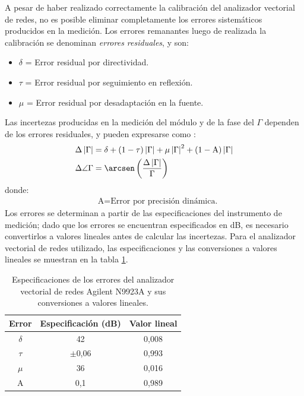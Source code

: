 A pesar de haber realizado correctamente la calibración del analizador vectorial de redes, no es posible eliminar completamente los errores sistemáticos producidos en la medición. Los errores remanantes luego de realizada la calibración se denominan \emph{errores residuales}, y son:
\begin{itemize}
\item $\delta$ = Error residual por directividad.
\item $\tau$ = Error residual por seguimiento en reflexión.
\item $\mu$ = Error residual por desadaptación en la fuente.
\end{itemize}
Las incertezas producidas en la medición del módulo y de la fase del $\Gamma$ dependen de los errores residuales, y pueden expresarse como \cite{Agilent_vna_err}:
\begin{subequations}
\label{grup_ec_apE:1}
\begin{align}
\Delta\left|\Gamma\right| &= \delta + \left(1 - \tau\right)\left|\Gamma\right| +  \mu\left|\Gamma\right|^2 + \left(1 - \text{A}\right)\left|\Gamma\right|
\label{ec_apE:2}\\
\Delta\angle\Gamma &= \arcsen\left(\dfrac{\Delta\left|\Gamma\right|}{\Gamma}\right)
\label{ec_apE:3}
\end{align}
\end{subequations}
donde:
\begin{align*}
&\text{A} = \text{Error por precisión dinámica.}
\end{align*}
Los errores se determinan a partir de las especificaciones del instrumento de medición; dado que los errores se encuentran especificados en dB, es necesario convertirlos a valores lineales antes de calcular las incertezas. Para el analizador vectorial de redes utilizado, las especificaciones \cite{Agilent_vna_man} y las conversiones a valores lineales se muestran en la tabla \ref{tabla_apE:1}.
\begin{table}[H]
\centering
\begin{tabular}{|c|c|c|}
\hline
Error & Especificación (dB) & Valor lineal\\
\hline
$\delta$ & 42 & 0,008\\
\hline
$\tau$ & $\pm$0,06 & 0,993\\
\hline
$\mu$ & 36 & 0,016\\
\hline
A & 0,1 & 0,989\\
\hline
\end{tabular}
\caption{Especificaciones de los errores del analizador vectorial de redes Agilent N9923A y sus conversiones a valores lineales.}
\label{tabla_apE:1}
\end{table}
